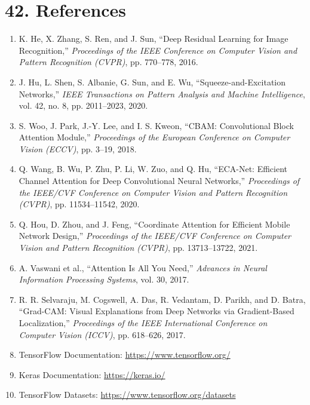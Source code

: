 \documentclass[10pt]{article}
\begin{document}
\clearpage
\section*{42. References}

\begin{enumerate}

\item
K. He, X. Zhang, S. Ren, and J. Sun,
``Deep Residual Learning for Image Recognition,''
\textit{Proceedings of the IEEE Conference on Computer Vision and Pattern
Recognition (CVPR)}, pp. 770--778, 2016.

\item
J. Hu, L. Shen, S. Albanie, G. Sun, and E. Wu,
``Squeeze-and-Excitation Networks,''
\textit{IEEE Transactions on Pattern Analysis and Machine Intelligence},
vol. 42, no. 8, pp. 2011--2023, 2020.

\item
S. Woo, J. Park, J.-Y. Lee, and I. S. Kweon,
``CBAM: Convolutional Block Attention Module,''
\textit{Proceedings of the European Conference on Computer Vision (ECCV)},
pp. 3--19, 2018.

\item
Q. Wang, B. Wu, P. Zhu, P. Li, W. Zuo, and Q. Hu,
``ECA-Net: Efficient Channel Attention for Deep Convolutional Neural
Networks,''
\textit{Proceedings of the IEEE/CVF Conference on Computer Vision and Pattern
Recognition (CVPR)}, pp. 11534--11542, 2020.

\item
Q. Hou, D. Zhou, and J. Feng,
``Coordinate Attention for Efficient Mobile Network Design,''
\textit{Proceedings of the IEEE/CVF Conference on Computer Vision and Pattern
Recognition (CVPR)}, pp. 13713--13722, 2021.

\item
A. Vaswani et al.,
``Attention Is All You Need,''
\textit{Advances in Neural Information Processing Systems},
vol. 30, 2017.

\item
R. R. Selvaraju, M. Cogswell, A. Das, R. Vedantam,
D. Parikh, and D. Batra,
``Grad-CAM: Visual Explanations from Deep Networks via
Gradient-Based Localization,''
\textit{Proceedings of the IEEE International Conference on Computer Vision
(ICCV)}, pp. 618--626, 2017.

\item
TensorFlow Documentation:
\url{https://www.tensorflow.org/}

\item
Keras Documentation:
\url{https://keras.io/}

\item
TensorFlow Datasets:
\url{https://www.tensorflow.org/datasets}

\end{enumerate}

\end{document}
